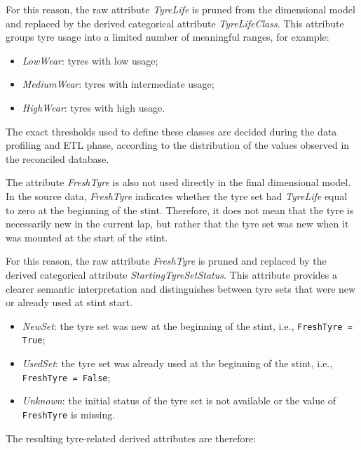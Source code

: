 \documentclass[a4paper,11pt]{article}
\begin{document}
	For this reason, the raw attribute \textit{TyreLife} is pruned from the dimensional model
	and replaced by the derived categorical attribute \textit{TyreLifeClass}. This attribute
	groups tyre usage into a limited number of meaningful ranges, for example:
	
	\begin{itemize}
		\item \textit{LowWear}: tyres with low usage;
		\item \textit{MediumWear}: tyres with intermediate usage;
		\item \textit{HighWear}: tyres with high usage.
	\end{itemize}
	
	The exact thresholds used to define these classes are decided during the data profiling
	and ETL phase, according to the distribution of the values observed in the reconciled
	database.
	
	The attribute \textit{FreshTyre} is also not used directly in the final dimensional model.
	In the source data, \textit{FreshTyre} indicates whether the tyre set had
	\textit{TyreLife} equal to zero at the beginning of the stint. Therefore, it does not mean
	that the tyre is necessarily new in the current lap, but rather that the tyre set was new
	when it was mounted at the start of the stint.
	
	For this reason, the raw attribute \textit{FreshTyre} is pruned and replaced by the
	derived categorical attribute \textit{StartingTyreSetStatus}. This attribute provides a
	clearer semantic interpretation and distinguishes between tyre sets that were new or
	already used at stint start.
	
	
	\begin{itemize}
		\item \textit{NewSet}: the tyre set was new at the beginning of the stint, i.e., \texttt{FreshTyre = True};
		\item \textit{UsedSet}: the tyre set was already used at the beginning of the stint, i.e., \texttt{FreshTyre = False};
		\item \textit{Unknown}: the initial status of the tyre set is not available or the value of \texttt{FreshTyre} is missing.
	\end{itemize}
	
	The resulting tyre-related derived attributes are therefore:
	
\end{document}
